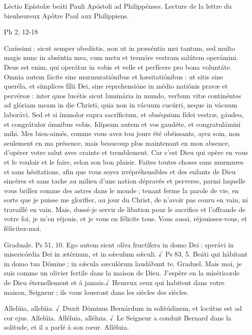 \begin{paracol}{2}
Léctio Epístolæ beáti Pauli Apóstoli ad Philippénses.
\switchcolumn
Lecture de la lettre du bienheureux Apôtre Paul aux Philippiens.
\switchcolumn*

Ph 2, 12-18
\switchcolumn

\switchcolumn*

Caríssimi : sicut semper obedístis,  non ut in præséntia mei tantum, sed multo magis nunc in abséntia mea, cum metu et tremóre vestram salútem operámini. Deus est enim, qui operátur in vobis et velle et perfícere pro bona voluntáte. Omnia autem fácite sine murmuratiónibus et hæsitatiónibus : ut sitis sine queréla, et símplices fílii Dei, sine reprehensióne in médio natiónis pravæ et pervérsæ : inter quos lucétis sicut luminária in mundo, verbum vitæ continéntes ad glóriam meam in die Christi, quia non in vácuum cucúrri, neque in vácuum laborávi. Sed et si ímmolor supra sacríficium, et obséquium fídei vestræ, gáudeo, et congrátulor ómnibus vobis. Idípsum autem et vos gaudéte, et congratulámini mihi.
\switchcolumn
Mes bien-aimés, comme vous avez tou jours été obéissants, ayez soin, non seulement en ma présence, mais beaucoup plus maintenant en mon absence, d’opérer votre salut avec crainte et tremblement. Car c’est Dieu qui opère en vous et le vouloir et le faire, selon son bon plaisir. Faites toutes choses sans murmures et sans hésitations,  afin que vous soyez irrépréhensibles et des enfants de Dieu sincères et sans tache au milieu d’une nation dépravée et perverse, parmi laquelle vous brillez comme des astres dans le monde ; tenant ferme la parole de vie, en sorte que je puisse me glorifier, au jour du Christ, de n’avoir pas couru en vain, ni travaillé en vain. Mais, dussé-je servir de libation pour le sacrifice et l’offrande de votre foi, je m’en réjouis, et je vous en félicite tous. Vous aussi, réjouissez-vous, et félicitez-moi.
\switchcolumn*

Graduale. Ps 51, 10. Ego autem sicut olíva fructífera in domo Dei : sperávi in misericórdia Dei in ætérnum, et in sǽculum sǽculi. √~Ps 83, 5. Beáti qui hábitant in domo tua Dómine ; in sǽcula sæculórum laudábunt te.
\switchcolumn
Graduel. Mais moi, je suis comme un olivier fertile dans la maison de Dieu. J’espère en la miséricorde de Dieu éternellement et à jamais.√~Heureux ceux qui habitent dans votre maison, Seigneur ; ils vous loueront dans les siècles des siècles.
\switchcolumn*

Allelúia, allelúia. √~Duxit Dóminus Bernárdum in solitúdinem, et locútus est ad cor ejus. Allelúia.
\switchcolumn
Alléluia, alléluia. √~Le Seigneur a conduit Bernard dans la solitude, et il a parlé à son cœur. Alléluia.
\switchcolumn*


\end{paracol}

